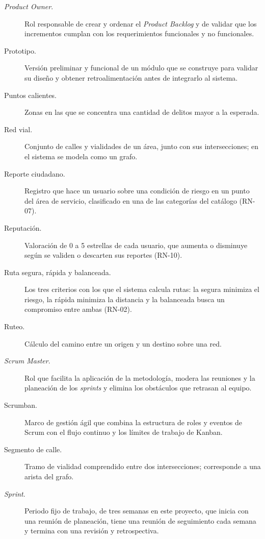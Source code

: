 \begin{description}
    \item[\textit{Product Owner}.] Rol responsable de crear y ordenar el \textit{Product Backlog} y de validar que los incrementos cumplan con los requerimientos funcionales y no funcionales.

    \item[Prototipo.] Versión preliminar y funcional de un módulo que se construye para validar su diseño y obtener retroalimentación antes de integrarlo al sistema.

    \item[Puntos calientes.] Zonas en las que se concentra una cantidad de delitos mayor a la esperada.

    \item[Red vial.] Conjunto de calles y vialidades de un área, junto con sus intersecciones; en el sistema se modela como un grafo.

    \item[Reporte ciudadano.] Registro que hace un usuario sobre una condición de riesgo en un punto del área de servicio, clasificado en una de las categorías del catálogo (RN-07).

    \item[Reputación.] Valoración de 0 a 5 estrellas de cada usuario, que aumenta o disminuye según se validen o descarten sus reportes (RN-10).

    \item[Ruta segura, rápida y balanceada.] Los tres criterios con los que el sistema calcula rutas: la segura minimiza el riesgo, la rápida minimiza la distancia y la balanceada busca un compromiso entre ambas (RN-02).

    \item[Ruteo.] Cálculo del camino entre un origen y un destino sobre una red.

    \item[\textit{Scrum Master}.] Rol que facilita la aplicación de la metodología, modera las reuniones y la planeación de los \textit{sprints} y elimina los obstáculos que retrasan al equipo.

    \item[Scrumban.] Marco de gestión ágil que combina la estructura de roles y eventos de Scrum con el flujo continuo y los límites de trabajo de Kanban.

    \item[Segmento de calle.] Tramo de vialidad comprendido entre dos intersecciones; corresponde a una arista del grafo.

    \item[\textit{Sprint}.] Periodo fijo de trabajo, de tres semanas en este proyecto, que inicia con una reunión de planeación, tiene una reunión de seguimiento cada semana y termina con una revisión y retrospectiva.


\end{description}
